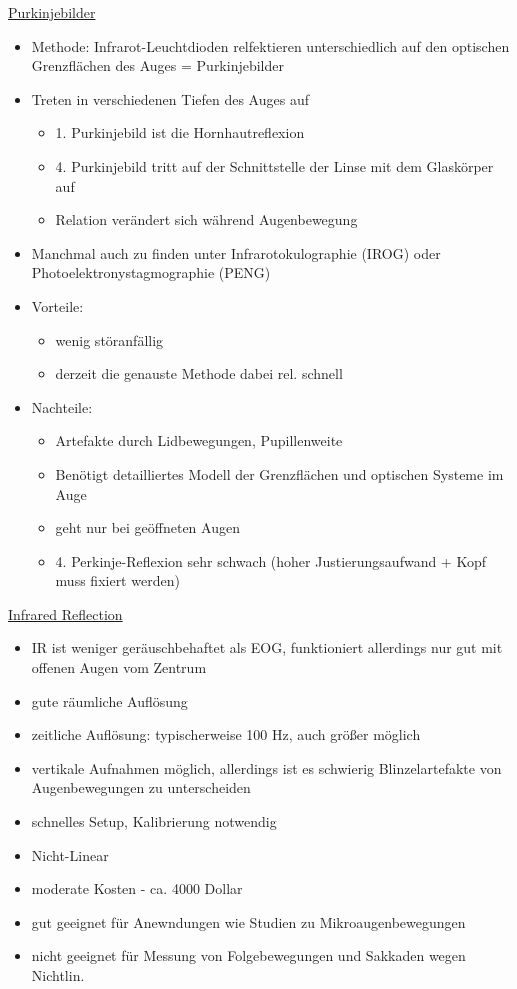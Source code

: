 \documentclass[a4paper,10pt,oneside]{article}
\begin{document}
\underline{Purkinjebilder} \\
	\begin{itemize}
		\item Methode: Infrarot-Leuchtdioden relfektieren unterschiedlich auf den optischen Grenzflächen des Auges = Purkinjebilder
		\item Treten in verschiedenen Tiefen des Auges auf
			\begin{itemize}
				\item 1. Purkinjebild ist die Hornhautreflexion
				\item 4. Purkinjebild tritt auf der Schnittstelle der Linse mit dem Glaskörper auf
				\item Relation verändert sich während Augenbewegung
			\end{itemize}
		\item Manchmal auch zu finden unter Infrarotokulographie (IROG) oder Photoelektronystagmographie (PENG)
		\item Vorteile:
			\begin{itemize}
				\item wenig störanfällig
				\item derzeit die genauste Methode dabei rel. schnell
			\end{itemize}
		\item Nachteile:
			\begin{itemize}
				\item Artefakte durch Lidbewegungen, Pupillenweite
				\item Benötigt detailliertes Modell der Grenzflächen und optischen Systeme im Auge
				\item geht nur bei geöffneten Augen
				\item 4. Perkinje-Reflexion sehr schwach (hoher Justierungsaufwand + Kopf muss fixiert werden)
			\end{itemize}
	\end{itemize}
	
\underline{Infrared Reflection} \\
	\begin{itemize}
		\item IR ist weniger geräuschbehaftet als EOG, funktioniert allerdings nur gut mit offenen Augen vom Zentrum
		\item gute räumliche Auflösung
		\item zeitliche Auflösung: typischerweise 100 Hz, auch größer möglich
		\item vertikale Aufnahmen möglich, allerdings ist es schwierig Blinzelartefakte von Augenbewegungen zu unterscheiden
		\item schnelles Setup, Kalibrierung notwendig
		\item Nicht-Linear
		\item moderate Kosten - ca. 4000 Dollar
		\item gut geeignet für Anewndungen wie Studien zu Mikroaugenbewegungen
		\item nicht geeignet für Messung von Folgebewegungen und Sakkaden wegen Nichtlin. 
	\end{itemize}
 		
\end{document}
